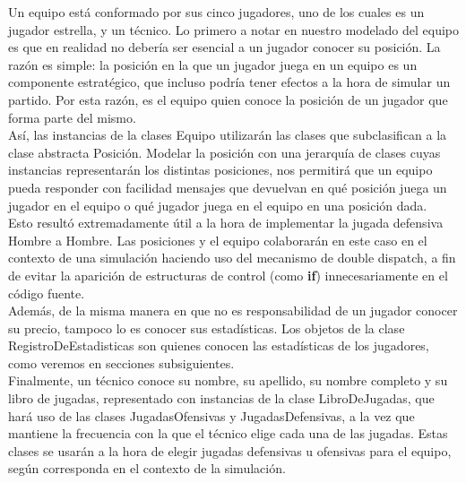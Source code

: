 Un equipo está conformado por sus cinco jugadores, uno de los cuales es un jugador estrella, y un técnico.
Lo primero a notar en nuestro modelado del equipo es que en realidad no debería ser esencial a un jugador conocer su posición. La razón es simple: la posición en la que un jugador juega en un equipo es un componente estratégico, que incluso podría tener efectos a la hora de simular un partido. Por esta razón, es el equipo quien conoce la posición de un jugador que forma parte del mismo. \\
Así, las instancias de la clases Equipo utilizarán las clases que subclasifican a la clase abstracta Posición. Modelar la posición con una jerarquía de clases cuyas instancias representarán los distintas posiciones, nos permitirá que un equipo pueda responder con facilidad mensajes que devuelvan en qué posición juega un jugador en el equipo o qué jugador juega en el equipo en una posición dada. \\
Esto resultó extremadamente útil a la hora de implementar la jugada defensiva Hombre a Hombre. Las posiciones y el equipo colaborarán en este caso en el contexto de una simulación haciendo uso del mecanismo de double dispatch, a fin de evitar la aparición de estructuras de control (como \textbf{if}) innecesariamente en el código fuente.\\
Además, de la misma manera en que no es responsabilidad de un jugador conocer su precio, tampoco lo es conocer sus estadísticas. Los objetos de la clase RegistroDeEstadisticas son quienes conocen las estadísticas de los jugadores, como veremos en secciones subsiguientes.\\
Finalmente, un técnico conoce su nombre, su apellido, su nombre completo y su libro de jugadas, representado con instancias de la clase LibroDeJugadas, que hará uso de las clases JugadasOfensivas y JugadasDefensivas, a la vez que mantiene la frecuencia con la que el técnico elige cada una de las jugadas. Estas clases se usarán a la hora de elegir jugadas defensivas u ofensivas para el equipo, según corresponda en el contexto de la simulación.\\

